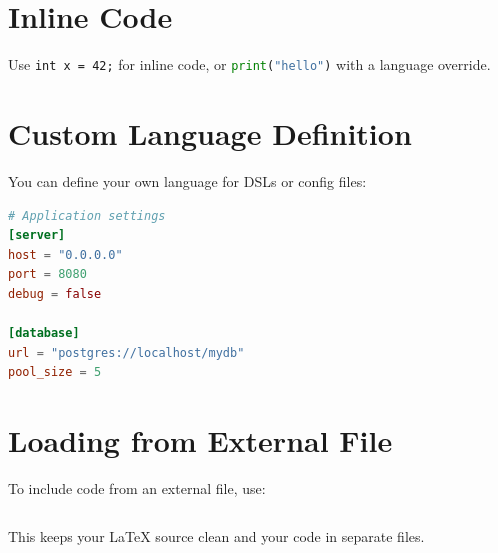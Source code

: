 \documentclass[12pt]{article}
\begin{document}
\section{Inline Code}

Use \lstinline|int x = 42;| for inline code, or
\lstinline[language=Python]|print("hello")| with a language override.

\section{Custom Language Definition}

You can define your own language for DSLs or config files:


\begin{lstlisting}[language=TOML, caption={Example TOML configuration}]
# Application settings
[server]
host = "0.0.0.0"
port = 8080
debug = false

[database]
url = "postgres://localhost/mydb"
pool_size = 5
\end{lstlisting}

\section{Loading from External File}

To include code from an external file, use:
\begin{verbatim}

\end{verbatim}

This keeps your \LaTeX{} source clean and your code in separate files.
\end{document}

